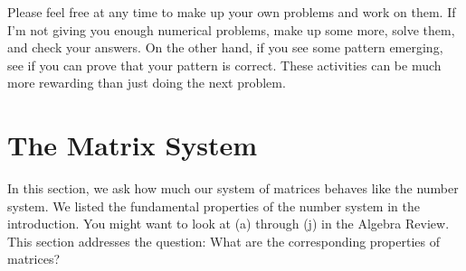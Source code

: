 \documentclass{article}
\begin{document}
Please feel free at any time to make up your own problems and work on them. If I'm not giving you enough numerical problems, make up some more, solve them, and check your answers. On the other hand, if you see some pattern emerging, see if you can prove that your pattern is correct. These activities can be much more rewarding than just doing the next problem.




\newpage

\section{The Matrix System}

In this section, we ask how much our system of matrices behaves like the number system. We listed the fundamental properties of the number system in the introduction. You might want to look at (a) through (j) in the Algebra Review. This section addresses the question: What are the corresponding properties of matrices?
\end{document}

